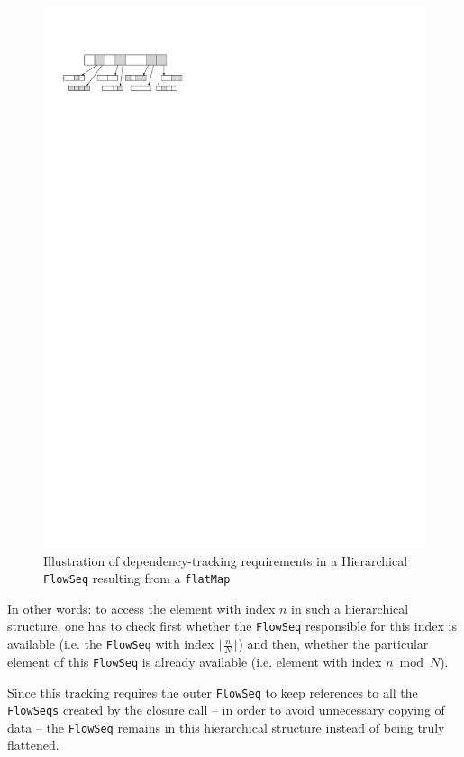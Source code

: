 \documentclass[runningheads,a4paper,fleqn]{llncs}
\begin{document}
\begin{figure}
  \centering
  \includegraphics{flatMap-dependency}
  \caption{Illustration of dependency-tracking requirements in a
    Hierarchical \texttt{FlowSeq} resulting from a \texttt{flatMap}}
  \label{fig:flatMap-dependency}
\end{figure}


In other words: to access the element with index $n$ in
such a hierarchical structure, one has to check first whether the
\texttt{FlowSeq} responsible for this index is available (i.e. the \texttt{FlowSeq}
with index $\lfloor \frac nN \rfloor$) and then, whether
the particular element of this \texttt{FlowSeq} is already available
(i.e. element with index $n \bmod N$).

Since this tracking requires the outer \texttt{FlowSeq} to keep references to
all the \texttt{FlowSeqs} created by the closure call -- in order to avoid
unnecessary copying of data -- the \texttt{FlowSeq} remains in this
hierarchical structure instead of being truly flattened.
\end{document}
